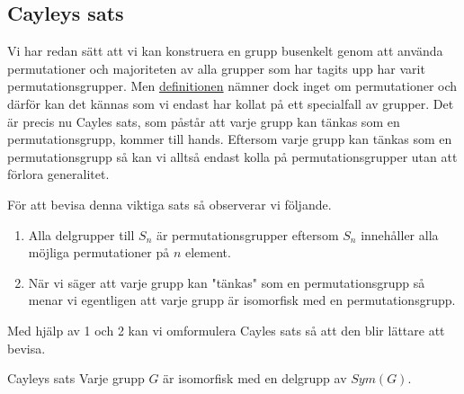 \documentclass{article}
\theoremstyle{definition}
\begin{document}
\subsection{Cayleys sats}
Vi har redan sätt att vi kan konstruera en grupp busenkelt genom att använda permutationer
och majoriteten av alla grupper som har tagits upp har varit permutationsgrupper. Men 
\hyperlink{def4.1}{definitionen} nämner dock inget om permutationer och därför 
kan det kännas som vi endast har kollat på ett specialfall av grupper. Det är precis nu 
Cayles sats, som påstår att varje grupp kan tänkas som en permutationsgrupp, kommer till hands. 
Eftersom varje grupp kan tänkas som en permutationsgrupp så kan vi alltså endast kolla 
på permutationsgrupper utan att förlora generalitet.

För att bevisa denna viktiga sats så observerar vi följande.
\begin{enumerate}
  \item Alla delgrupper till $S_n$ är permutationsgrupper eftersom $S_n$ 
  innehåller alla möjliga permutationer på $n$ element.
  \item När vi säger att varje grupp kan "tänkas" som en permutationsgrupp så menar vi egentligen att varje grupp är isomorfisk med en permutationsgrupp. 
\end{enumerate}
Med hjälp av 1 och 2 kan vi omformulera Cayles sats så att den blir lättare att bevisa. 
\begin{mytheo}{Cayleys sats}{}
  Varje grupp $G$ är isomorfisk med en delgrupp av $Sym(G)$.
\end{mytheo}
\end{document}
